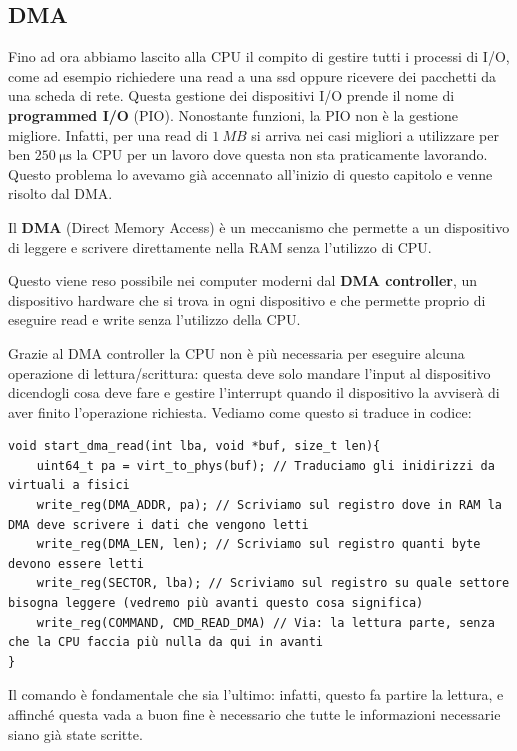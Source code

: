 \documentclass[11pt, a4paper, titlepage, oneside]{scrbook}
\begin{document}
\subsection{DMA}

Fino ad ora abbiamo lascito alla CPU il compito di gestire tutti i processi di I/O, come ad esempio richiedere una read a una ssd oppure ricevere dei pacchetti da una scheda di rete. Questa gestione dei dispositivi I/O prende il nome di \textbf{programmed I/O} (PIO). Nonostante funzioni, la PIO non è la gestione migliore. Infatti, per una read di $\SI{1}{MB}$ si arriva nei casi migliori a utilizzare per ben $\SI{250}{\micro\second}$ la CPU per un lavoro dove questa non sta praticamente lavorando. Questo problema lo avevamo già accennato all'inizio di questo capitolo e venne risolto dal DMA.

\begin{Definizione}[DMA]
\label{def-DMA}
Il \textbf{DMA} (Direct Memory Access) è un meccanismo che permette a un dispositivo di leggere e scrivere direttamente nella RAM senza l'utilizzo di CPU.
\end{Definizione}

Questo viene reso possibile nei computer moderni dal \textbf{DMA controller}, un dispositivo hardware che si trova in ogni dispositivo e che permette proprio di eseguire read e write senza l'utilizzo della CPU.

Grazie al DMA controller la CPU non è più necessaria per eseguire alcuna operazione di lettura/scrittura: questa deve solo mandare l'input al dispositivo dicendogli cosa deve fare e gestire l'interrupt quando il dispositivo la avviserà di aver finito l'operazione richiesta. Vediamo come questo si traduce in codice:

\begin{lstlisting}[style=C]
void start_dma_read(int lba, void *buf, size_t len){
    uint64_t pa = virt_to_phys(buf); // Traduciamo gli inidirizzi da virtuali a fisici
    write_reg(DMA_ADDR, pa); // Scriviamo sul registro dove in RAM la DMA deve scrivere i dati che vengono letti
    write_reg(DMA_LEN, len); // Scriviamo sul registro quanti byte devono essere letti
    write_reg(SECTOR, lba); // Scriviamo sul registro su quale settore bisogna leggere (vedremo più avanti questo cosa significa)
    write_reg(COMMAND, CMD_READ_DMA) // Via: la lettura parte, senza che la CPU faccia più nulla da qui in avanti
}
\end{lstlisting}

\NB Il comando  è fondamentale che sia l'ultimo: infatti, questo fa partire la lettura, e affinché questa vada a buon fine è necessario che tutte le informazioni necessarie siano già state scritte.
\end{document}
